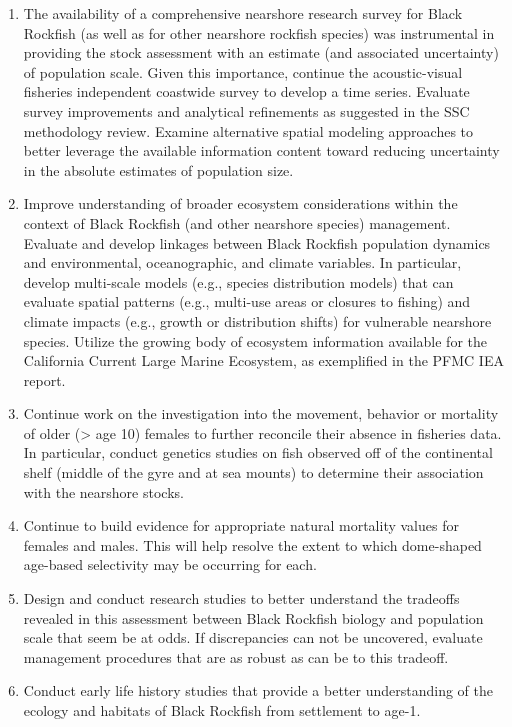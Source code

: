 \documentclass[11pt,
  english,
  letterpaper,
]{article}
\providecommand{\tightlist}{%
  \setlength{\itemsep}{0pt}\setlength{\parskip}{0pt}}
\providecommand{\tightlist}{%
  \setlength{\itemsep}{0pt}\setlength{\parskip}{0pt}}
\begin{document}
\begin{enumerate}
\def\labelenumi{\arabic{enumi}.}
\tightlist
\item
  The availability of a comprehensive nearshore research survey for Black Rockfish (as well as for other nearshore rockfish species) was instrumental in providing the stock assessment with an estimate (and associated uncertainty) of population scale. Given this importance, continue the acoustic-visual fisheries independent coastwide survey to develop a time series. Evaluate survey improvements and analytical refinements as suggested in the SSC methodology review. Examine alternative spatial modeling approaches to better leverage the available information content toward reducing uncertainty in the absolute estimates of population size.
\item
  Improve understanding of broader ecosystem considerations within the context of Black Rockfish (and other nearshore species) management. Evaluate and develop linkages between Black Rockfish population dynamics and environmental, oceanographic, and climate variables. In particular, develop multi-scale models (e.g., species distribution models) that can evaluate spatial patterns (e.g., multi-use areas or closures to fishing) and climate impacts (e.g., growth or distribution shifts) for vulnerable nearshore species. Utilize the growing body of ecosystem information available for the California Current Large Marine Ecosystem, as exemplified in the PFMC IEA report.
\item
  Continue work on the investigation into the movement, behavior or mortality of older (\textgreater{} age 10) females to further reconcile their absence in fisheries data. In particular, conduct genetics studies on fish observed off of the continental shelf (middle of the gyre and at sea mounts) to determine their association with the nearshore stocks.
\item
  Continue to build evidence for appropriate natural mortality values for females and males. This will help resolve the extent to which dome-shaped age-based selectivity may be occurring for each.
\item
  Design and conduct research studies to better understand the tradeoffs revealed in this assessment between Black Rockfish biology and population scale that seem be at odds. If discrepancies can not be uncovered, evaluate management procedures that are as robust as can be to this tradeoff.
\item
  Conduct early life history studies that provide a better understanding of the ecology and habitats of Black Rockfish from settlement to age-1.
\end{enumerate}
\end{document}
